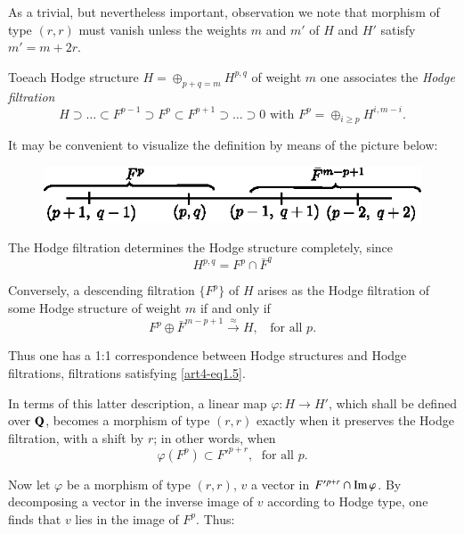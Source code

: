 As a trivial, but nevertheless important, observation we note that morphism of type $(r,r)$ must vanish unless the weights $m$ and $m'$ of $H$ and $H'$ satisfy $m'=m+2r$.

To\pageoriginale each Hodge structure $H = \oplus_{p+q =m} H^{p,q}$ of weight $m$ one associates the \textit{Hodge filtration}
\setcounter{equation}{2}
\begin{equation}
H \supset \ldots \subset F^{p-1} \supset F^p \subset F^{p+1} \supset \ldots \supset 0 \text{ with } F^p = \oplus_{i \geqslant p} H^{i, m-i}.  \label{art4-eq1.3}
\end{equation}

It may be convenient to visualize the definition by means of the picture below:
\begin{figure}[H]
\centering
\includegraphics{art4-fig1.eps}
\end{figure}

The Hodge filtration determines the Hodge structure completely, since
\begin{equation}
H^{p,q} = F^p \cap \bar{F}^q \label{art4-eq1.4}
\end{equation}

Conversely, a descending filtration $\{F^p\}$ of $H$ arises as the Hodge filtration of some Hodge structure of weight $m$ if and only if
\begin{equation}
F^p \oplus \bar{F}^{m-p+1} \xrightarrow{\approx} H, \;\; \text{ for all } p.
\label{art4-eq1.5}
\end{equation}

Thus one has a 1:1 correspondence between Hodge structures and Hodge filtrations, \iec filtrations satisfying \eqref{art4-eq1.5}.

In terms of this latter description, a linear map $\varphi: H \to H'$, which shall be defined over $\mathbf{Q}$, becomes a morphism of type $(r, r)$ exactly when it preserves the Hodge filtration, with a shift by $r$; in other words, when 
\begin{equation}
\varphi (F^p) \subset F'^{p+r}, \;\text{ for all }p. \label{art4-eq1.6}
\end{equation}

Now let $\varphi$ be a morphism of type $(r, r)$, $v$ a vector in $F'^{p+r} \cap \operatorname{Im} \varphi$. By decomposing a vector in the inverse image of $v$ according to Hodge type, one finds that $v$ lies in the image of $F^p$. Thus:

